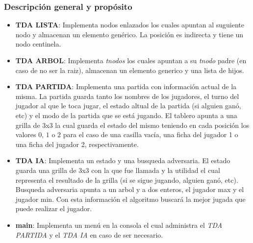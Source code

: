 \documentclass[12pt,a4paper]{article}
\begin{document}
\subsubsection{Descripci\'on general y prop\'osito}
\begin{itemize}
    \item {\bf TDA LISTA}: Implementa nodos enlazados los cuales apuntan al suguiente nodo y almacenan un elemento gen\'erico. La posici\'on es indirecta y tiene un nodo centinela.
	\item {\bf TDA ARBOL}: Implementa \emph{tnodos} los cuales apuntan a su \emph{tnodo} padre (en caso de no ser la raiz), almacenan un elemento generico y una lista de hijos.
    \item {\bf TDA PARTIDA}: Implementa una partida con informaci\'on actual de la misma. La partida guarda tanto los nombres de los jugadores, el turno del jugador al que le toca jugar, el estado altual de la partida (si alguien gan\'o, etc) y el modo de la partida que se est\'a jugando. El tablero apunta a una grilla de 3x3 la cual guarda el estado del mismo teniendo en cada posici\'on los valores $0$, $1$ o $2$ para el caso de una casilla vac\'ia, una ficha del jugador 1 o una ficha del jugador 2, respectivamente.
    \item {\bf TDA IA}: Implementa un estado y una busqueda adversaria. El estado guarda una grilla de 3x3 con la que fue llamada y la utilidad el cual representa el resultado de la grilla (si se sigue jugando, alguien gan\'o, etc). Busqueda adversaria apunta a un arbol y a dos enteros, el jugador max y el jugador min. Con esta informaci\'on el algoritmo buscar\'a la mejor jugada que puede realizar el jugador.
    \item {\bf main}: Implementa un men\'u en la consola el cual administra el {\itshape TDA PARTIDA} y el {\itshape TDA IA} en caso de ser necesario.
\end{itemize}
\end{document}
